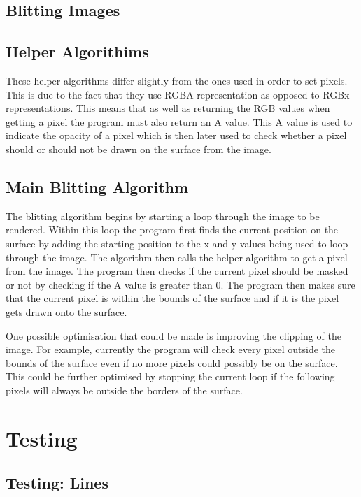 \documentclass[
	a4paper, %
	10pt, %
]{CSUniSchoolLabReport}
\begin{document}
\subsection{Blitting Images}
\subsection*{Helper Algorithims}
\begin{flushleft}
	These helper algorithms differ slightly from the ones used in order to set pixels. This is due to the fact that
	they use RGBA representation as opposed to RGBx representations. This means that as well as returning the RGB values
	when getting a pixel the program must also return an A value. This A value is used to indicate the opacity of a pixel 
	which is then later used to check whether a pixel should or should not be drawn on the surface from the image.
\end{flushleft}
\subsection*{Main Blitting Algorithm}
\begin{flushleft}
	The blitting algorithm begins by starting a loop through the image to be rendered. Within this loop 
	the program first finds the current position on the surface by adding the starting position to the x and y
	values being used to loop through the image. The algorithm then calls the helper algorithm to get a pixel from the image.
	The program then checks if the current pixel should be masked or not by checking if the A value is greater than 0. The program
	then makes sure that the current pixel is within the bounds of the surface and if it is the pixel gets drawn onto the surface.
\end{flushleft}
\begin{flushleft}
	One possible optimisation that could be made is improving the clipping of the image. For example, currently the program will check every 
	pixel outside the bounds of the surface even if no more pixels could possibly be on the surface. This could be further optimised
	by stopping the current loop if the following pixels will always be outside the borders of the surface.
\end{flushleft}
\section{Testing}
\subsection{Testing: Lines}
\end{document}

